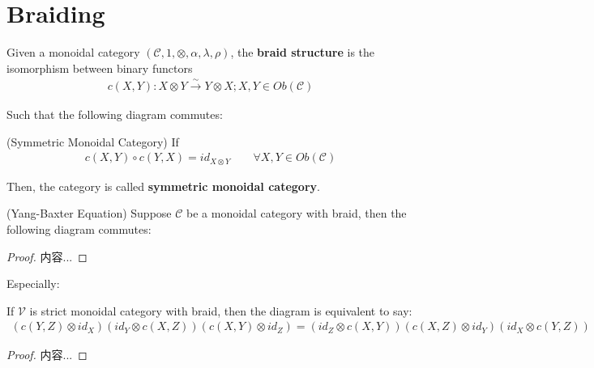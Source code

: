 \documentclass[Total.tex]{subfiles}
\begin{document}
		\section{Braiding}
			\begin{Def}
				Given a monoidal category $(\mathcal{C},1,\otimes,\alpha,\lambda,\rho)$, the \textbf{braid structure} is the isomorphism between binary functors
				\begin{gather*}
					c(X,Y):X\otimes Y\stackrel{\sim}{\rightarrow } Y\otimes X;X,Y\in Ob(\mathcal{C})
				\end{gather*}
				
				Such that the following diagram commutes:
				\begin{center}
				\end{center}
			\end{Def}
			
			\begin{Def}
				(Symmetric Monoidal Category) If
				\begin{gather*}
					c(X,Y)\circ c(Y,X)=id_{X\otimes Y}\qquad \forall X,Y\in Ob(\mathcal{C})
				\end{gather*}
				
				Then, the category is called \textbf{symmetric monoidal category}.
			\end{Def}
			
			\begin{proposition}
				(Yang-Baxter Equation) Suppose $\mathcal{C}$ be a monoidal category with braid, then the following diagram commutes:
				\begin{center}
				\end{center}
			\end{proposition}
			\begin{proof}
				内容...
			\end{proof}
			
			Especially:
			\begin{corollary}
				If $\mathcal{V}$ is strict monoidal category with braid, then the diagram is equivalent to say:
				\begin{gather*}
					(c(Y,Z)\otimes id_X)(id_Y\otimes c(X,Z))(c(X,Y)\otimes id_Z)=(id_Z\otimes c(X,Y))(c(X,Z)\otimes id_Y)(id_X\otimes c(Y,Z))
				\end{gather*}
			\end{corollary}
			\begin{proof}
				内容...
			\end{proof}
			
\end{document}
